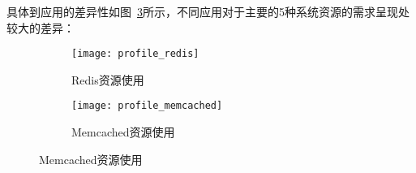 具体到应用的差异性如图~\ref{fig:resource_affinity_0}所示，不同应用对于主要的5种系统资源的需求呈现处较大的差异：

\begin{figure}[H]
    \centering
    \begin{subfigure}[b]{0.85\textwidth}
      \texttt{[image: profile\_redis]}
      \caption{Redis资源使用}
      \label{fig:profile_redis}
    \end{subfigure}
    \begin{subfigure}[b]{0.85\textwidth}
        \texttt{[image: profile\_memcached]}
        \caption{Memcached资源使用}
        \label{fig:profile_memcached}
    \end{subfigure}
\label{fig:resource_affinity_0}
\end{figure}

